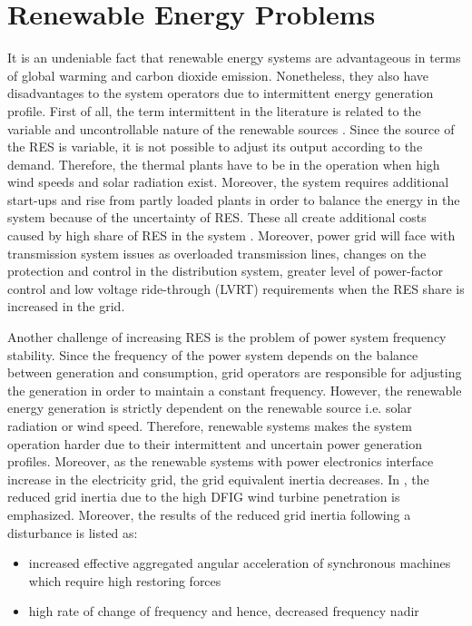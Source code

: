 \section{Renewable Energy Problems}
It is an undeniable fact that renewable energy systems are advantageous in terms of global warming and carbon dioxide emission. Nonetheless, they also have disadvantages to the system operators due to intermittent energy generation profile. First of all, the term intermittent in the literature is related to the variable and uncontrollable nature of the renewable sources \cite{KlingeJacobsen2010}. Since the source of the RES is variable, it is not possible to adjust its output according to the demand. Therefore, the thermal plants have to be in the operation when high wind speeds and solar radiation exist. Moreover, the system requires additional start-ups and rise from partly loaded plants in order to balance the energy in the system because of the uncertainty of RES. These all create additional costs caused by high share of RES in the system \cite{Zipf2013}. Moreover, power grid will face with transmission system issues as overloaded transmission lines, changes on the protection and control in the distribution system, greater level of power-factor control and low voltage ride-through (LVRT) requirements when the RES share is increased in the grid\cite{Ipakchi2009}.\par
Another challenge of increasing RES is the problem of power system frequency stability. Since the frequency of the power system depends on the balance between generation and consumption, grid operators are responsible for adjusting the generation in order to maintain a constant frequency. However, the renewable energy generation is strictly dependent on the renewable source i.e. solar radiation or wind speed. Therefore, renewable systems makes the system operation harder due to their intermittent and uncertain power generation profiles. Moreover, as the renewable systems with power electronics interface increase in the electricity grid, the grid equivalent inertia decreases. In \cite{Gautam2011}, the reduced grid inertia due to the high DFIG wind turbine penetration is emphasized. Moreover, the results of the reduced grid inertia following a disturbance is listed as: 
\begin{itemize}
	\item increased effective aggregated angular acceleration of synchronous machines which require high restoring forces
	\item high rate of change of frequency and hence, decreased frequency nadir
\end{itemize}
